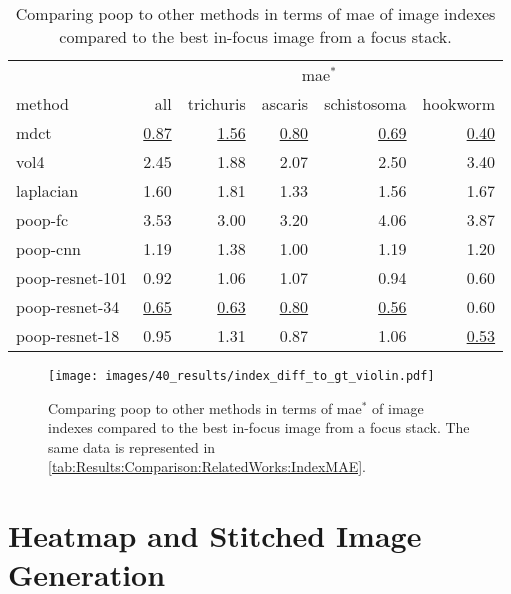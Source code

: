 \begin{table}
    \centering
    \caption{Comparing \acs{poop} to other methods in terms of \ac{mae} of image indexes compared to the best in-focus image from a focus stack.}
    \begin{tabular}{lrrrrr}
        \hline
        \multicolumn{1}{c}{} & \multicolumn{5}{c}{\ac{mae}$^*$} \\
        \cline{2-6}
        method & all & trichuris & ascaris & schistosoma & hookworm \\
        \hline
        \acs{mdct}      & \underline{0.87} & \underline{1.56} & \underline{0.80} & \underline{0.69} & \underline{0.40} \\
        \acs{vol4}      & 2.45 & 1.88 & 2.07 & 2.50 & 3.40 \\
        \acs{laplacian} & 1.60 & 1.81 & 1.33 & 1.56 & 1.67 \\
        \hline
        \acs{poop}-\acs{fc}              & 3.53 & 3.00 & 3.20 & 4.06 & 3.87 \\
        \acs{poop}-\acs{cnn}             & 1.19 & 1.38 & 1.00 & 1.19 & 1.20 \\
        \acs{poop}-\acs{resnet}-101      & 0.92 & 1.06 & 1.07 & 0.94 & 0.60 \\
        \acs{poop}-\acs{resnet}-34       & \underline{0.65} & \underline{0.63} & \underline{0.80} & \underline{0.56} & 0.60 \\
        \acs{poop}-\acs{resnet}-18       & 0.95 & 1.31 & 0.87 & 1.06 & \underline{0.53} \\
    \end{tabular}
    \label{tab:Results:Comparison:RelatedWorks:IndexMAE}
\end{table}

\begin{figure}
    \centering
    \texttt{[image: images/40\_results/index\_diff\_to\_gt\_violin.pdf]}
    \caption{Comparing \acs{poop} to other methods in terms of \ac{mae}$^*$ of image indexes compared to the best in-focus image from a focus stack. The same data is represented in \autoref{tab:Results:Comparison:RelatedWorks:IndexMAE}.}
    \label{fig:Results:Comparison:RelatedWorks:IndexMAE}
\end{figure}

\FloatBarrier

\section{Heatmap and Stitched Image Generation}
\label{sec:Results:HeatStiched}

